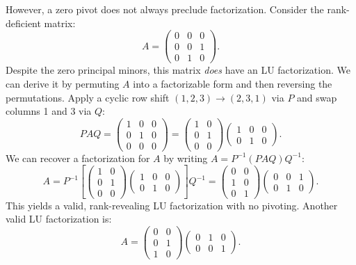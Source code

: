 \documentclass[final]{siamart1116}
\numberwithin{theorem}{section}
\begin{document}
However, a zero pivot does not always preclude factorization. Consider the rank-deficient matrix:
\[
  A =
  \begin{pmatrix} 0 & 0 & 0 \\ 0 & 0 & 1 \\ 0 & 1 & 0
  \end{pmatrix}.
\]
Despite the zero principal minors, this matrix \emph{does} have an LU factorization. We can derive it by permuting $A$ into a factorizable form and then reversing the permutations. Apply a cyclic row shift $(1,2,3) \to (2,3,1)$ via $P$ and swap columns 1 and 3 via $Q$:
\[
  PAQ =
  \begin{pmatrix} 1 & 0 & 0 \\ 0 & 1 & 0 \\ 0 & 0 & 0
  \end{pmatrix}
  =
  \begin{pmatrix} 1 & 0 \\ 0 & 1 \\ 0 & 0
  \end{pmatrix}
  \begin{pmatrix} 1 & 0 & 0 \\ 0 & 1 & 0
  \end{pmatrix}.
\]
We can recover a factorization for $A$ by writing $A = P^{-1} (PAQ) Q^{-1}$:
\[
  A = P^{-1} \left[
    \begin{pmatrix} 1 & 0 \\ 0 & 1 \\ 0 & 0
    \end{pmatrix}
    \begin{pmatrix} 1 & 0 & 0 \\ 0 & 1 & 0
  \end{pmatrix} \right] Q^{-1} =
  \begin{pmatrix} 0 & 0 \\ 1 & 0 \\ 0 & 1
  \end{pmatrix}
  \begin{pmatrix} 0 & 0 & 1 \\ 0 & 1 & 0
  \end{pmatrix}.
\]
This yields a valid, rank-revealing LU factorization with no pivoting. Another valid LU factorization is:
\[
  A =
  \begin{pmatrix} 0 & 0 \\ 0 & 1 \\ 1 & 0
  \end{pmatrix}
  \begin{pmatrix} 0 & 1 & 0 \\ 0 & 0 & 1
  \end{pmatrix}.
\]
\end{document}
